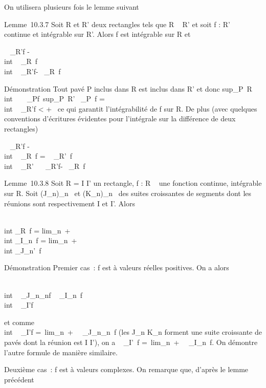 \documentclass[]{article}
\begin{document}
On utilisera plusieurs fois le lemme suivant

Lemme~10.3.7 Soit R et R' deux rectangles tels que R \subset~ R' et soit f : R'
\rightarrow~  continue et intégrable sur R'. Alors f est intégrable sur R et

\left \int ~
\int  _R'f -\\int ~
\int  _R~f\right
\leq\int  \\int ~
_R'f-\int ~
\int  _R~f

Démonstration Tout pavé P inclus dans R est inclus dans R' et donc
sup_P\subset~R\\int ~
\int ~
_Pf\leq\
sup_P\subset~R'\int ~
\int  _P~f
=\int  \\int ~
_R'f \textless{} +\infty~ ce qui garantit
l'intégrabilité de f sur R. De plus (avec quelques conventions
d'écritures évidentes pour l'intégrale sur la différence de deux
rectangles)

\left \int ~
\int  _R'f -\\int ~
\int  _R~f\right
 = \left \int ~
\int  _R'\diagdownR~f\right
\leq\int  \\int ~
_R'\diagdownRf\leq\int ~
\int ~
_R'f-\int ~
\int  _R~f

Lemme~10.3.8 Soit R = I \times I' un rectangle, f : R \rightarrow~  une fonction
continue, intégrable sur R. Soit (J_n)_n\in{}~ et
(K_n)_n\in\mathbb{N}~ des suites croissantes de segments dont les
réunions sont respectivement I et I'. Alors

\int  \\int  _R~f
= lim_n\rightarrow~+\infty~~\\int
 \int  _I\timesK_n~f
= lim_n\rightarrow~+\infty~~\\int
 \int  _J_n\timesI'~f

Démonstration Premier cas~: f est à valeurs réelles positives. On a
alors

\int  \\int ~
_J_n\timesK_nf \leq\int ~
\int  _I\timesK_n~f
\leq\int  \\int ~
_I\timesI'f

et comme \int  \\int ~
_I\timesI'f =\
lim_n\rightarrow~+\infty~\int ~
\int  _J_n\timesK_n~f (les
J_n _n forment une suite croissante de pavés dont
la réunion est I \times I'), on a \int ~
\int  _I\timesI'~f =\
lim_n\rightarrow~+\infty~\int ~
\int  _I\timesK_n~f. On démontre
l'autre formule de manière similaire.

Deuxième cas~: f est à valeurs complexes. On remarque que, d'après le
lemme précédent
\end{document}
